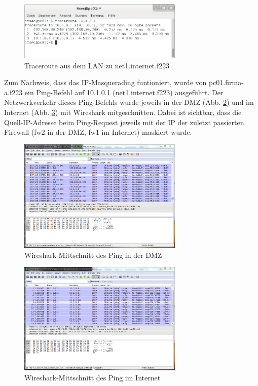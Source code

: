 \begin{figure}[h!]
	\centering
		\includegraphics[width=0.7\textwidth]{figures/pc01_traceroute_net1.png}
	\caption{Traceroute aus dem LAN zu net1.internet.f223}
	\label{fig:pc01_traceroute_net1}
\end{figure}

Zum Nachweis, dass das IP-Masquerading funtioniert, wurde von pc01.firma-a.f223 ein Ping-Befehl auf 10.1.0.1 (net1.internet.f223) ausgeführt. Der Netzwerkverkehr dieses Ping-Befehls wurde jeweils in der DMZ (Abb. \ref{fig:ws_dmz}) und im Internet (Abb. \ref{fig:ws_internet}) mit Wireshark mitgeschnitten. Dabei ist sichtbar, dass die Quell-IP-Adresse beim Ping-Request jeweils mit der IP der zuletzt passierten Firewall (fw2 in der DMZ, fw1 im Internet) maskiert wurde.

\begin{figure}[h!]
	\centering
		\includegraphics[width=0.7\textwidth]{figures/ws_dmz.png}
	\caption{Wireshark-Mittschnitt des Ping in der DMZ}
	\label{fig:ws_dmz}
\end{figure}

\begin{figure}[h!]
	\centering
		\includegraphics[width=0.7\textwidth]{figures/ws_internet.png}
	\caption{Wireshark-Mittschnitt des Ping im Internet}
	\label{fig:ws_internet}
\end{figure}

